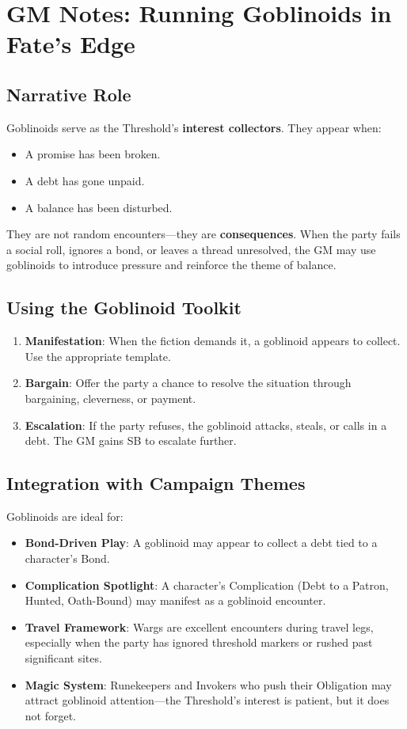 \section{GM Notes: Running Goblinoids in Fate's Edge}

\subsection{Narrative Role}

Goblinoids serve as the Threshold's \textbf{interest collectors}. They appear when:
\begin{itemize}
    \item A promise has been broken.
    \item A debt has gone unpaid.
    \item A balance has been disturbed.
\end{itemize}

They are not random encounters---they are \textbf{consequences}. When the party fails a social roll, ignores a bond, or leaves a thread unresolved, the GM may use goblinoids to introduce pressure and reinforce the theme of balance.

\subsection{Using the Goblinoid Toolkit}

\begin{enumerate}
    \item \textbf{Manifestation}: When the fiction demands it, a goblinoid appears to collect. Use the appropriate template.
    \item \textbf{Bargain}: Offer the party a chance to resolve the situation through bargaining, cleverness, or payment.
    \item \textbf{Escalation}: If the party refuses, the goblinoid attacks, steals, or calls in a debt. The GM gains SB to escalate further.
\end{enumerate}

\subsection{Integration with Campaign Themes}

Goblinoids are ideal for:
\begin{itemize}
    \item \textbf{Bond-Driven Play}: A goblinoid may appear to collect a debt tied to a character's Bond.
    \item \textbf{Complication Spotlight}: A character's Complication (Debt to a Patron, Hunted, Oath-Bound) may manifest as a goblinoid encounter.
    \item \textbf{Travel Framework}: Wargs are excellent encounters during travel legs, especially when the party has ignored threshold markers or rushed past significant sites.
    \item \textbf{Magic System}: Runekeepers and Invokers who push their Obligation may attract goblinoid attention---the Threshold's interest is patient, but it does not forget.
\end{itemize}

